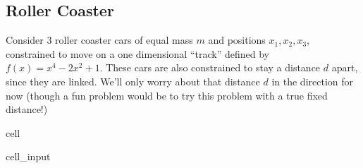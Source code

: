 \documentclass[letterpaper,10pt,english]{jupyterBook}
\begin{document}
\subsection{Roller Coaster}
\label{\detokenize{content/1_mechanics/lagrange_1:roller-coaster}}
\sphinxAtStartPar
Consider 3 roller coaster cars of equal mass \(m\) and positions \(x_1,x_2,x_3\), constrained to move on a one dimensional “track” defined by \(f(x) = x^4 -2x^2 + 1\). These cars are also constrained to stay a distance \(d\) apart, since they are linked. We’ll only worry about that distance \(d\) in the direction for now (though a fun problem would be to try this problem with a true fixed distance!)

\begin{sphinxuseclass}{cell}\begin{sphinxVerbatimInput}

\begin{sphinxuseclass}{cell_input}
\begin{sphinxVerbatim}[commandchars=\\\{\}]
  
         
  
  
  
    
    
   
    
    
    
\end{sphinxVerbatim}


\end{sphinxuseclass}
\end{sphinxVerbatimInput}
\end{sphinxuseclass}
\end{document}
